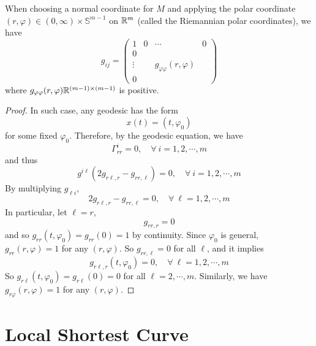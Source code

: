 \begin{thm}
	When choosing a normal coordinate for $M$ and applying the polar coordinate $(r,\varphi) \in (0,\infty)\times \mathbb{S}^{m-1}$ on $\mathbb{R}^m$ (called the Riemannian polar coordinates), we have
	\begin{equation*}
		g_{i j}=\left(
			\begin{array}{cccc}
				1 & 0 & \cdots & 0 \\
				0 & & & \\
				\vdots & & g_{\varphi \varphi}(r, \varphi) & \\
				0 & & &
			\end{array}
			\right)
	\end{equation*}
	where $g_{\varphi \varphi}(r, \varphi) \mathbb{R}^{(m-1)\times (m-1)}$ is positive.
\end{thm}
\begin{proof}
	In such case, any geodesic has the form
	\begin{equation*}
		x(t) = (t,\varphi_0)
	\end{equation*}
	for some fixed $\varphi_0$. Therefore, by the geodesic equation, we have
	\begin{equation*}
		\Gamma_{rr}^i = 0,\quad \forall~i=1,2,\cdots,m
	\end{equation*}
	and thus
	\begin{equation*}
		g^{i \ell}\left(2 g_{r \ell, r}-g_{r r, \ell}\right)=0,\quad \forall~i=1,2,\cdots,m
	\end{equation*}
	By multiplying $g_{\ell i}$,
	\begin{equation*}
		2 g_{r \ell, r}-g_{r r, \ell}=0,\quad \forall~\ell=1,2,\cdots,m
	\end{equation*}
	In particular, let $\ell = r$,
	\begin{equation*}
		g_{rr,r} = 0
	\end{equation*}
	and so $g_{rr}(t,\varphi_0) = g_{rr}(0) = 1$ by continuity. Since $\varphi_0$ is general, $g_{rr}(r,\varphi) = 1$ for any $(r,\varphi)$. So $g_{rr,\ell} = 0$ for all $\ell$, and it implies
	\begin{equation*}
		g_{r \ell, r}(t,\varphi_0) = 0,\quad \forall~\ell = 1,2,\cdots,m
	\end{equation*}
	So $g_{r \ell}(t,\varphi_0) = g_{r\ell}(0) = 0$ for all $\ell = 2,\cdots,m$. Similarly, we have $g_{r\varphi}(r,\varphi) = 1$ for any $(r,\varphi)$.
\end{proof}

\section{Local Shortest Curve}

